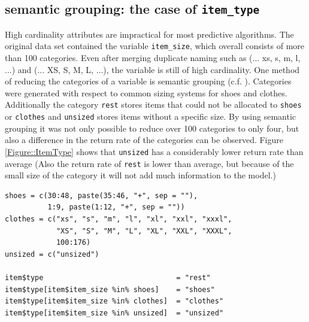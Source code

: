 \documentclass[a4paper,12pt]{article}
\begin{document}
\subsection{semantic grouping: the case of \texttt{item\_type}}
High cardinality attributes are impractical for most predictive algorithms. The original data set contained the variable \texttt{item\_size}, which overall consists of more than 100 categories. Even after merging duplicate naming such as (... xs, s, m, l, ...) and (... XS, S, M, L, ...), the variable is still of high cardinality. One method of reducing the categories of a variable is semantic grouping (c.f. \cite{moeyersoms2015}). Categories were generated with respect to common sizing systems for shoes and clothes. Additionally the category \texttt{rest} stores items that could not be allocated to \texttt{shoes} or \texttt{clothes} and \texttt{unsized} stores items without a specific size. By using semantic grouping it was not only possible to reduce over 100 categories to only four, but also a difference in the return rate of the categories can be observed. Figure \ref{Figure::ItemType} shows that \texttt{unsized} has a considerably lower return rate than average (Also the return rate of \texttt{rest} is lower than average, but because of the small size of the category it will not add much information to the model.)
\newpage
\begin{lstlisting}
shoes = c(30:48, paste(35:46, "+", sep = ""),
          1:9, paste(1:12, "+", sep = ""))
clothes = c("xs", "s", "m", "l", "xl", "xxl", "xxxl",
            "XS", "S", "M", "L", "XL", "XXL", "XXXL",
            100:176)
unsized = c("unsized")

item$type                               = "rest"
item$type[item$item_size %in% shoes]    = "shoes"
item$type[item$item_size %in% clothes]  = "clothes"
item$type[item$item_size %in% unsized]  = "unsized"

\end{lstlisting}
\end{document}

